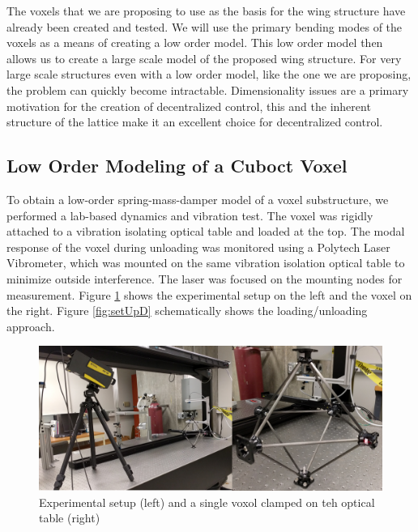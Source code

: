 \documentclass[11pt]{ucthesis}
\begin{document}
The voxels that we are proposing to use as the basis for the wing structure have already been created and tested.\cite{jenett2016meso} We will use the primary bending modes of the voxels as a means of creating a low order model. This low order model then allows us to create a large scale model of the proposed wing structure. For very large scale structures even with a low order model, like the one we are proposing, the problem can quickly become intractable. Dimensionality issues are a primary motivation for the creation of decentralized control\cite{bakule2008decentralized}, this and the inherent structure of the lattice make it an excellent choice for decentralized control.

\subsection{Low Order Modeling of a Cuboct Voxel}
\label{sec:model}
To obtain a low-order spring-mass-damper model of a voxel substructure, we performed a lab-based dynamics and vibration test. The voxel was rigidly attached to a vibration isolating optical table and loaded at the top. The modal response of the voxel during unloading was monitored using a Polytech Laser Vibrometer, which was mounted on the same vibration isolation optical table to minimize outside interference. The laser was focused on the mounting nodes for measurement. Figure \ref{fig:setUp} shows the experimental setup on the left and the voxel on the right. Figure \ref{fig:setUpD} schematically shows the loading/unloading approach.

\begin{figure}[thpb]
\centering
\includegraphics[width=0.75\linewidth]{Figures/experimentalSetup.png}
\caption{Experimental setup (left) and a single voxol clamped on teh optical table (right)}
\label{fig:setUp}
\end{figure}
\end{document}
